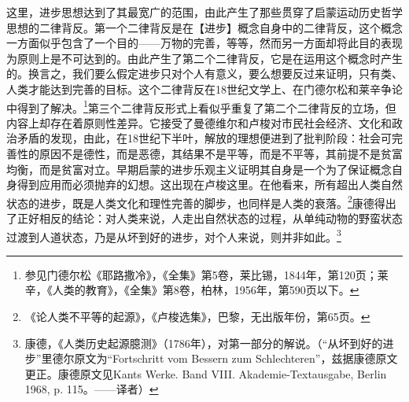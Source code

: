 这里，进步思想达到了其最宽广的范围，由此产生了那些贯穿了启蒙运动历史哲学思想的二律背反。第一个二律背反是在【进步】概念自身中的二律背反，这个概念一方面似乎包含了一个目的——万物的完善，等等，然而另一方面却将此目的表现为原则上是不可达到的。由此产生了第二个二律背反，它是在运用这个概念时产生的。换言之，我们要么假定进步只对个人有意义，要么想要反过来证明，只有类、人类才能达到完善的目标。这个二律背反在18世纪文学上、在门德尔松和莱辛争论中得到了解决。\footnote{参见门德尔松《耶路撒冷》，《全集》第5卷，莱比锡，1844年，第120页；莱辛，《人类的教育》，《全集》第8卷，柏林，1956年，第590页以下。}第三个二律背反形式上看似乎重复了第二个二律背反的立场，但内容上却存在着原则性差异。它接受了曼德维尔和卢梭对市民社会经济、文化和政治矛盾的发现，由此，在18世纪下半叶，解放的理想便进到了批判阶段：社会可完善性的原因不是德性，而是恶德，其结果不是平等，而是不平等，其前提不是贫富均衡，而是贫富对立。早期启蒙的进步乐观主义证明其自身是一个为了保证概念自身得到应用而必须抛弃的幻想。这出现在卢梭这里。在他看来，所有超出人类自然状态的进步，既是人类文化和理性完善的脚步，也同样是人类的衰落。\footnote{《论人类不平等的起源》，《卢梭选集》，巴黎，无出版年份，第65页。}康德得出了正好相反的结论：对人类来说，人走出自然状态的过程，从单纯动物的野蛮状态过渡到人道状态，乃是从坏到好的进步，对个人来说，则并非如此。\footnote{康德，《人类历史起源臆测》（1786年），对第一部分的解说。（“从坏到好的进步”里德尔原文为“Fortschritt vom Bessern zum Schlechteren”，兹据康德原文更正。康德原文见Kants Werke. Band VIII. Akademie-Textausgabe, Berlin 1968, p. 115。——译者）}

